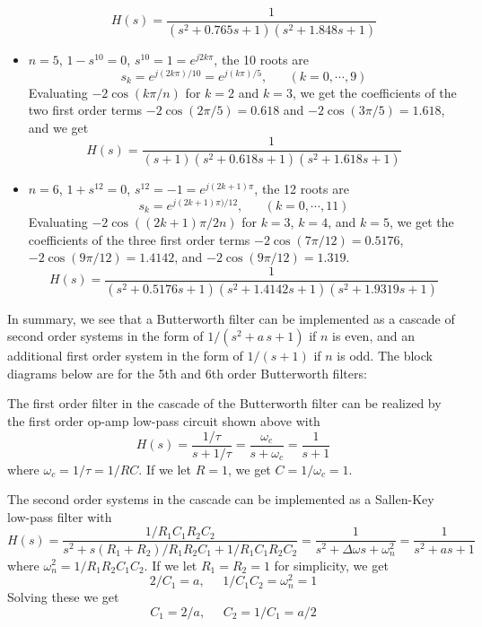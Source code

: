 \documentclass{article}
\begin{document}
\begin{itemize}
\begin{equation}
    H(s)=\frac{1}{(s^2+0.765 s+1)(s^2+1.848 s+1)}
    \end{equation}
  \item $n=5$, $1-s^{10}=0$, $s^{10}=1=e^{j2k\pi}$, the 10 roots are
    \begin{equation}
    s_k=e^{j(2k\pi)/10}=e^{j(k\pi)/5},\;\;\;\;\;\;(k=0,\cdots,9)
    \end{equation}
    Evaluating $-2\cos(k\pi/n)$ for $k=2$ and $k=3$, we get the
    coefficients of the two first order terms
    $-2\cos(2\pi/5)=0.618$ and $-2\cos(3\pi/5)=1.618$, and we get
    \begin{equation}
    H(s)=\frac{1}{(s+1)(s^2+0.618 s+1)(s^2+1.618 s+1)}
    \end{equation}
  \item $n=6$, $1+s^{12}=0$, $s^{12}=-1=e^{j(2k+1)\pi}$, the 12 roots are
    \begin{equation}
    s_k=e^{j(2k+1)\pi)/12},\;\;\;\;\;\;(k=0,\cdots,11)
    \end{equation}
    Evaluating $-2\cos((2k+1)\pi/2n)$ for $k=3$, $k=4$, and $k=5$,
    we get the coefficients of the three first order terms
    $-2\cos(7\pi/12)=0.5176$, $-2\cos(9\pi/12)=1.4142$, and
    $-2\cos(9\pi/12)=1.319$.
    \begin{equation}
    H(s)=\frac{1}{(s^2+0.5176 s+1)(s^2+1.4142 s+1)(s^2+1.9319 s+1)}
    \end{equation}
  \end{itemize}
  In summary, we see that a Butterworth filter can be implemented as
  a cascade of second order systems in the form of $1/(s^2+a\,s+1)$ 
  if $n$ is even, and an additional first order system in the form of
  $1/(s+1)$ if $n$ is odd. The block diagrams below are for the 5th 
  and 6th order Butterworth filters:


  The first order filter in the cascade of the Butterworth filter 
  can be realized by the first order op-amp low-pass circuit shown
  above with
  \begin{equation}
  H(s)=\frac{1/\tau}{s+1/\tau}=\frac{\omega_c}{s+\omega_c}=\frac{1}{s+1}
  \end{equation}
  where $\omega_c=1/\tau=1/RC$. If we let $R=1$, we get $C=1/\omega_c=1$. 

  The second order systems in the cascade can be implemented as a 
  Sallen-Key low-pass filter with 
  \begin{equation}
  H(s)=\frac{1/R_1C_1R_2C_2}{s^2+s(R_1+R_2)/R_1R_2C_1+1/R_1C_1R_2C_2}
  =\frac{1}{s^2+\Delta\omega s+\omega_n^2}=\frac{1}{s^2+a s+1}
  \end{equation}
  where $\omega_n^2=1/R_1R_2C_1C_2$. If we let $R_1=R_2=1$ for simplicity, 
  we get
  \begin{equation}
  2/C_1=a,\;\;\;\;\;1/C_1C_2=\omega_n^2=1
  \end{equation}
  Solving these we get
  \begin{equation}
  C_1=2/a,\;\;\;\;\; C_2=1/C_1=a/2
  \end{equation}
\end{document}
